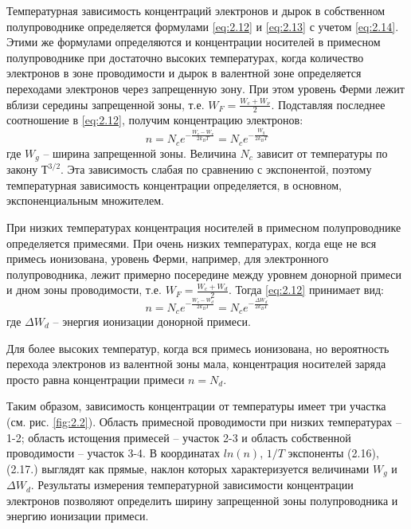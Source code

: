 Температурная зависимость концентраций электронов и дырок в собственном полупроводнике определяется формулами \eqref{eq:2.12} и \eqref{eq:2.13} с учетом
\eqref{eq:2.14}. Этими же формулами определяются и концентрации носителей в примесном полупроводнике при достаточно высоких
температурах, когда количество электронов в зоне проводимости и дырок в валентной зоне определяется переходами
электронов через запрещенную зону. При этом уровень Ферми лежит вблизи середины запрещенной зоны, т.е. $W_F =
\frac{W_c+W_{\nu}}{2}$. Подставляя последнее соотношение в \eqref{eq:2.12}, получим концентрацию электронов:
\begin{equation}
	n=N_{c} e^{-\frac{W_{c}-W_{v}}{2 k_{B} T}}=N_{c} e^{-\frac{W_{g}}{2 k_{B} T}}
	\label{eq:2.16}
\end{equation}
где $W_g$  – ширина запрещенной зоны. Величина $N_c$ зависит от температуры по закону $Т^{3/2}$. Эта зависимость слабая по
сравнению с экспонентой, поэтому температурная зависимость концентрации определяется, в основном, экспоненциальным
множителем. 

При низких температурах концентрация носителей в примесном полупроводнике определяется примесями. При очень низких
температурах, когда еще не вся примесь ионизована, уровень Ферми, например, для электронного полупроводника, лежит
примерно посередине между уровнем донорной примеси и дном зоны проводимости, т.е. $W_F = \frac{W_c+W_{d}}{2}$. Тогда \eqref{eq:2.12}
принимает вид: 
\begin{equation}
	n=N_{c} e^{-\frac{W_{c}-W_{d}}{2 k_{B} T}}=N_{c} e^{-\frac{\Delta W_{d}}{2 k_{B} T}}
	\label{eq:2.17}
\end{equation}
где $\Delta W_d$ – энергия ионизации донорной примеси. 

Для более высоких температур, когда вся примесь ионизована, но вероятность перехода электронов из валентной зоны мала,
концентрация носителей заряда просто равна концентрации примеси $n=N_d$. 


Таким образом, зависимость концентрации от температуры имеет три участка (см. рис. \ref{fig:2.2}). Область примесной проводимости
при низких температурах – 1-2; область истощения примесей – участок 2-3 и область собственной проводимости – участок
3-4. В координатах $ln(n)$, $1/T$ экспоненты (2.16), (2.17.) выглядят как прямые, наклон которых характеризуется величинами
$W_g$ и $\Delta W_d$. Результаты измерения температурной зависимости концентрации электронов позволяют определить ширину
запрещенной зоны полупроводника и энергию ионизации примеси.

